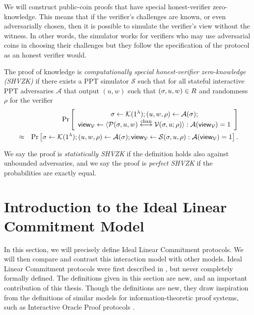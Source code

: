 We will construct public-coin proofs that have special honest-verifier zero-knowledge. This means that if the verifier's challenges are known, or even adversarially chosen, then it is possible to simulate the verifier's view without the witness.  In other words, the simulator works for verifiers who may use adversarial coins in choosing their challenges but they follow the specification of the protocol as an honest verifier would. 
\begin{definition}
The proof of knowledge is \emph{computationally special honest-verifier zero-knowledge (SHVZK)} if there exists a PPT simulator $\mathcal{S}$ such that for all stateful interactive PPT adversaries $\mathcal{A}$ that output $(u,w)$ such that $(\mathsf{\sigma},u,w)\in R$ and randomness $\rho$ for the verifier
\begin{eqnarray*}
&&\Pr \left[ \begin{array}{c}\mathsf{\sigma}\gets \mathcal{K}(1^{\lambda});(u, w, \rho) \leftarrow\mathcal{A}(\mathsf{\sigma}); \\
\mathsf{view}_{\mathcal{V}}\leftarrow \langle \mathcal{P}(\mathsf{\sigma},u,w)\overset{\textnormal{chan}}{\longleftrightarrow} \mathcal{V}(\mathsf{\sigma},u;\rho)\rangle: \mathcal{A}(\mathsf{view}_{\mathcal{V}})=1\end{array} \right]\\
&\approx &\Pr \left[ \mathsf{\sigma}\gets \mathcal{K}(1^{\lambda});(u, w, \rho) \leftarrow\mathcal{A}(\mathsf{\sigma}); \mathsf{view}_{\mathcal{V}}\leftarrow \mathcal{S}(\mathsf{\sigma},u,\rho): \mathcal{A}(\mathsf{view}_{\mathcal{V}})=1\right].
\end{eqnarray*}

We say the proof is \emph{statistically SHVZK} if the definition holds also against unbounded adversaries, and we say the proof is \emph{perfect SHVZK} if the probabilities are exactly equal.
\end{definition}

\section{Introduction to the Ideal Linear Commitment Model}
\label{formalILCmodel}

In this section, we will precisely define Ideal Linear Commitment protocols. We will then compare and contrast this interaction model with other models. Ideal Linear Commitment protocols were first described in \cite{BootleCGGHJ17}, but never completely formally defined. The definitions given in this section are new, and an important contribution of this thesis. Though the definitions are new, they draw inspiration from the definitions of similar models for information-theoretic proof systems, such as Interactive Oracle Proof protocols \cite{Ben-SassonCS16}.

